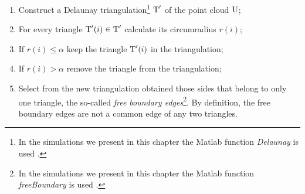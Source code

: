 \begin{enumerate}
\item Construct a Delaunay triangulation\footnote{In the simulations we present in this chapter the Matlab function \textit{Delaunay} is used \cite{matlab_delaunay}.} $\mbox{$\textup{T}$}^\prime$ of the point cloud $\mbox{$\textup{U}$}$;
\item For every triangle $\mbox{$\textup{T}$}^\prime(i)\in \mbox{$\textup{T}$}^\prime$ calculate its circumradius $r(i)$;
\item If $r(i)\leq\alpha$ keep the triangle $\mbox{$\textup{T}$}^\prime(i)$ in the triangulation;
\item If $r(i)>\alpha$ remove the triangle from the triangulation;
\item Select from the new triangulation obtained those sides that belong to only one triangle, the so-called \textit{free boundary edges}\footnote{In the simulations we present in this chapter the Matlab function \textit{freeBoundary} is used \cite{matlab_free}.}. By definition, the free boundary edges are not a common edge of any two triangles.
\end{enumerate}
